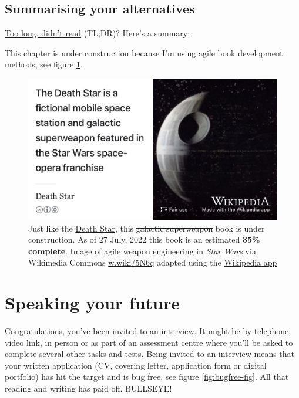 \documentclass[
]{book}
\begin{document}
\hypertarget{tldr11}{%
\section{Summarising your alternatives}\label{tldr11}}

\href{https://en.wiktionary.org/wiki/too_long;_didn\%27t_read}{Too long, didn't read} (TL;DR)? Here's a summary:

This chapter is under construction because I'm using agile book development methods, see figure \ref{fig:deathstar8-fig}.

\begin{figure}

{\centering \includegraphics[width=0.99\linewidth]{images/DeathStar2} 

}

\caption{Just like the \href{https://en.wikipedia.org/wiki/Death_Star}{Death Star}, this \sout{galactic superweapon} book is under construction. As of 27 July, 2022 this book is an estimated \textbf{35\% complete}. Image of agile weapon engineering in \emph{Star Wars} via Wikimedia Commons \href{https://w.wiki/5N6q}{w.wiki/5N6q} adapted using the \href{https://apps.apple.com/gb/app/wikipedia/id324715238}{Wikipedia app}}\label{fig:deathstar8-fig}
\end{figure}

\hypertarget{speaking}{%
\chapter{Speaking your future}\label{speaking}}

Congratulations, you've been invited to an interview. It might be by telephone, video link, in person or as part of an assessment centre where you'll be asked to complete several other tasks and tests. Being invited to an interview means that your written application (CV, covering letter, application form or digital portfolio) has hit the target and is bug free, see figure \ref{fig:bugfree-fig}. All that reading and writing has paid off. BULLSEYE! 🎯
\end{document}
